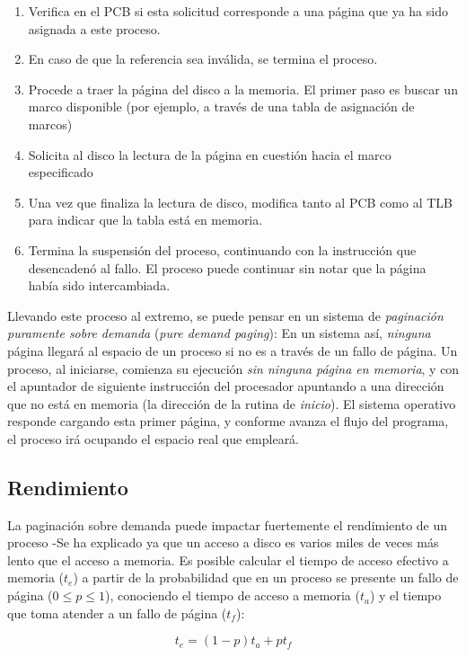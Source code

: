 \documentclass[11pt,fleqn]{book} %
\begin{document}
\begin{enumerate}
\item Verifica en el PCB si esta solicitud corresponde a una página que
   ya ha sido asignada a este proceso.
\item En caso de que la referencia sea inválida, se termina el proceso.
\item Procede a traer la página del disco a la memoria. El primer paso es
   buscar un marco disponible (por ejemplo, a través de una tabla de
   asignación de marcos)
\item Solicita al disco la lectura de la página en cuestión hacia el
   marco especificado
\item Una vez que finaliza la lectura de disco, modifica tanto al PCB
   como al TLB para indicar que la tabla está en memoria.
\item Termina la suspensión del proceso, continuando con la instrucción
   que desencadenó al fallo. El proceso puede continuar sin notar 
   que la página había sido intercambiada.
\end{enumerate}

Llevando este proceso al extremo, se puede pensar en un sistema de
\emph{paginación puramente sobre demanda} (\emph{pure demand paging}): En un
sistema así, \emph{ninguna} página llegará al espacio de un proceso si no
es a través de un fallo de página. Un proceso, al iniciarse, comienza
su ejecución \emph{sin ninguna página en memoria}, y con el apuntador de
siguiente instrucción del procesador apuntando a una dirección que no
está en memoria (la dirección de la rutina de \emph{inicio}). El sistema operativo 
responde cargando esta primer página, y conforme avanza el flujo del 
programa, el proceso irá ocupando el espacio real que empleará.
\subsection{Rendimiento}
\label{sec-5-5-2}


La paginación sobre demanda puede impactar fuertemente el rendimiento
de un proceso -Se ha explicado ya que un acceso a disco es varios miles de
veces más lento que el acceso a memoria. Es posible calcular el tiempo de
acceso efectivo a memoria ($t_e$) a partir de la probabilidad que en
un proceso se presente un fallo de página ($0 \le p \le 1$),
conociendo el tiempo de acceso a memoria ($t_a$) y el tiempo que toma
atender a un fallo de página ($t_f$):

$$t_e = (1-p)t_a + pt_f$$
\end{document}
